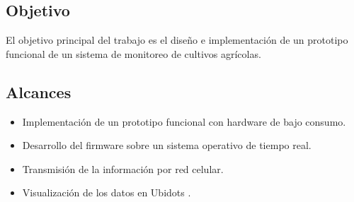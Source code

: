 \subsection{Objetivo}
El objetivo principal del trabajo es el diseño e implementación de un prototipo funcional de un sistema de monitoreo de cultivos agrícolas.
\subsection{Alcances}

\begin{itemize}
  \item Implementación de un prototipo funcional con hardware de bajo consumo. 	
  \item Desarrollo del firmware sobre un sistema operativo de tiempo real.
  \item Transmisión de la información por red celular.
  \item Visualización de los datos en Ubidots \citep{InterfazIoTUbidots}.
\end{itemize}